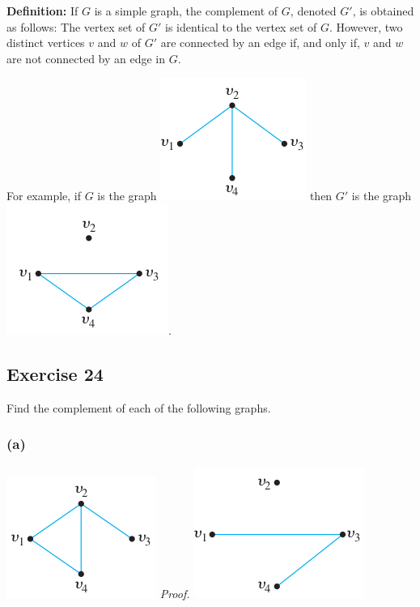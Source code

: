 \documentclass[14pt]{extarticle}
\newcommand{\cy}{\color{cyan}}
\begin{document}
\begin{tcolorbox}[colframe=cyan]
{\bf \cy Definition:} If \(G\) is a simple graph, the complement of \(G\), denoted \(G'\), is obtained as follows: 
The vertex set of \(G'\) is identical to the vertex set of \(G\). However, two distinct vertices \(v\) and \(w\) of \(G'\) 
are connected by an edge if, and only if, \(v\) and \(w\) are not connected by an edge in \(G\). 

For example, if \(G\) is the graph \includegraphics[scale=0.4]{../images/10.1.24.1.png} then \(G'\) is the graph 
\includegraphics[scale=0.4]{../images/10.1.24.2.png}.
\end{tcolorbox}

\subsection{Exercise 24}
Find the complement of each of the following graphs.

\subsubsection{(a)}
\includegraphics[scale=0.5]{../images/10.1.24.a.1.png}
{\it Proof.}
\includegraphics[scale=0.5]{../images/10.1.24.a.2.png}
\end{document}
